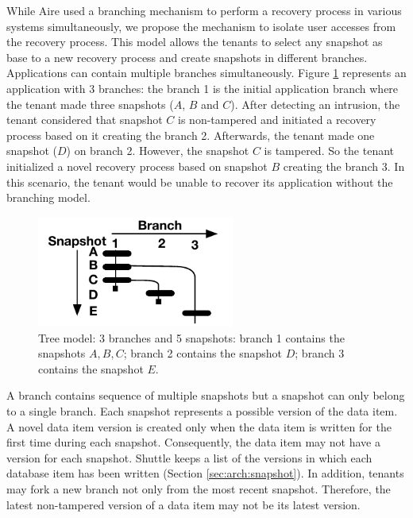 While Aire \cite{retro} used a branching mechanism to perform a recovery process in various systems simultaneously, we propose the mechanism to isolate user accesses from the recovery process. This model allows the tenants to select any snapshot as base to a new recovery process and create snapshots in different branches. Applications can contain multiple branches simultaneously. Figure \ref{fig:branches} represents an application with 3 branches: the branch 1 is the initial application branch where the tenant made three snapshots ($A$, $B$ and $C$). After detecting an intrusion, the tenant considered that snapshot $C$ is non-tampered and initiated a recovery process based on it creating the branch 2. Afterwards, the tenant made one snapshot ($D$) on branch 2. However, the snapshot $C$ is tampered. So the tenant initialized a novel recovery process based on snapshot $B$ creating the branch 3. In this scenario, the tenant would be unable to recover its application without the branching model.\\


\begin{figure}
\centering
\includegraphics[width=65mm]{images/branches}
\caption[Tree model]{Tree model: 3 branches and 5 snapshots: branch 1 contains the snapshots $A, B, C$; branch 2 contains the snapshot $D$;  branch 3 contains the snapshot $E$.}
\label{fig:branches}
\end{figure}

A branch contains sequence of multiple snapshots but a snapshot can only belong to a single branch. Each snapshot represents a possible version of the data item. A novel data item version is created only when the data item is written for the first time during each snapshot. Consequently, the data item may not have a version for each snapshot. Shuttle keeps a list of the versions in which each database item has been written (Section \ref{sec:arch:snapshot}).
In addition, tenants may fork a new branch not only from the most recent snapshot. Therefore, the latest non-tampered version of a data item may not be its latest version.

